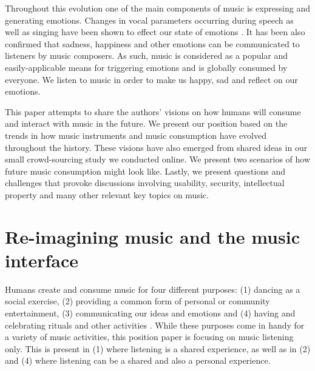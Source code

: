 \documentclass[sigchi]{acmart}
\begin{document}
Throughout this evolution one of the main components of music is expressing and generating emotions. Changes in vocal parameters occurring during speech as well as singing have been shown to effect our state of emotions \cite{kappert2019aim}. It has been also confirmed that sadness, happiness and other emotions can be communicated to listeners by music composers. As such, music is considered as a popular and easily-applicable means for triggering emotions \cite{kappert2019aim} and is globally consumed by everyone. We listen to music in order to make us happy, sad and  reflect on our emotions. 

This paper attempts to share the authors' visions on how humans will consume and interact with music in the future. We present our position based on the trends in how music instruments and music consumption have evolved throughout the history. These visions have also emerged from shared ideas in our small crowd-sourcing study we conducted online. We present two scenarios of how future music consumption might look like. Lastly, we present questions and challenges that provoke discussions involving usability, security, intellectual property and many other relevant key topics on music. 

\section{Re-imagining music and the music interface}
Humans create and consume music for four different purposes: (1) dancing as a social exercise, (2) providing a common form of personal or community entertainment, (3) communicating our ideas and emotions and (4) having and celebrating rituals and other activities \cite{montagu2017music}. While these purposes come in handy for a variety of music activities, this position paper is focusing on music listening only. This is present in (1) where listening is a shared experience, as well as in (2) and (4) where listening can be a  shared and also a personal experience. 
\end{document}
